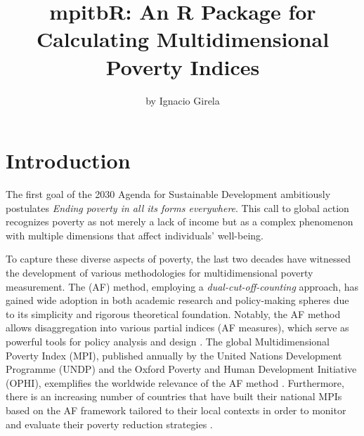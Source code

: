\title{mpitbR: An R Package for Calculating Multidimensional Poverty Indices}


\author{by Ignacio Girela}

\maketitle


\section{Introduction}\label{introduction}

The first goal of the 2030 Agenda for Sustainable Development ambitiously postulates \emph{Ending poverty in all its forms everywhere}. This call to global action recognizes poverty as not merely a lack of income but as a complex phenomenon with multiple dimensions that affect individuals' well-being.

To capture these diverse aspects of poverty, the last two decades have witnessed the development of various methodologies for multidimensional poverty measurement. The \citet{alkire2011} (AF) method, employing a \emph{dual-cut-off-counting} approach, has gained wide adoption in both academic research and policy-making spheres due to its simplicity and rigorous theoretical foundation. Notably, the AF method allows disaggregation into various partial indices (AF measures), which serve as powerful tools for policy analysis and design \citep{MPIpolicytool}. The global Multidimensional Poverty Index (MPI), published annually by the United Nations Development Programme (UNDP) and the Oxford Poverty and Human Development Initiative (OPHI), exemplifies the worldwide relevance of the AF method \citep{gMPI-report2022}. Furthermore, there is an increasing number of countries that have built their national MPIs based on the AF framework tailored to their local contexts in order to monitor and evaluate their poverty reduction strategies \citep{nationalMPIs}.

